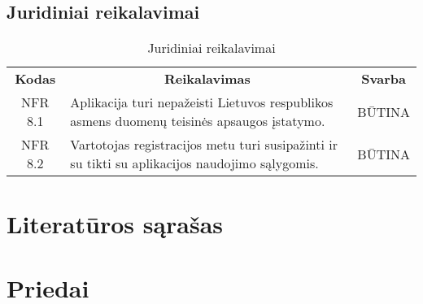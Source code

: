 \documentclass{VUMIFPSkursinis}
\begin{document}
\subsection{Juridiniai reikalavimai}
\begin{center}
	\begin{table}[H]
	\begin{tabular}{|p{2cm}|p{}|p{}|}
	\hline
	    \rowcolor{lightgray}
		\multicolumn{3}{|c|}{Juridiniai reikalavimai}\\
		
	\hline
		\multicolumn{1}{|c|}{{\bfseries Kodas}}&
		\multicolumn{1}{|c|}{{\bfseries Reikalavimas}}&
		\multicolumn{1}{|c|}{{\bfseries Svarba}}\\
	\hline 	
		\multicolumn{1}{|c|}{NFR 8.1}&
		{Aplikacija turi nepažeisti Lietuvos respublikos asmens duomenų teisinės apsaugos įstatymo.}&
		\multicolumn{1}{|c|}{BŪTINA}\\	
	
	\hline 	
		\multicolumn{1}{|c|}{NFR 8.2}&
		{Vartotojas registracijos metu turi susipažinti ir su tikti su aplikacijos naudojimo sąlygomis.}&
		\multicolumn{1}{|c|}{BŪTINA}\\	
	
	\hline 	
	\end{tabular}
	\caption{Juridiniai reikalavimai}
	\label{table:Juridiniaireikalavimai}
	\end{table}

\end{center}

\pagebreak

\section{Literatūros sąrašas}

\section{Priedai}
\end{document}
